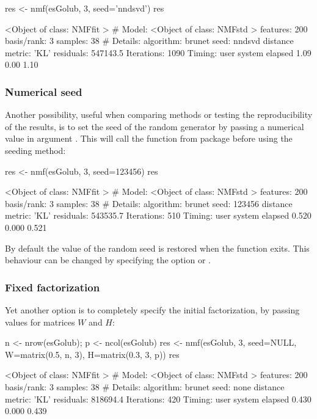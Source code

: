 \documentclass[a4paper]{article}
\begin{document}
\begin{Schunk}
\begin{Sinput}
 res <- nmf(esGolub, 3, seed='nndsvd')
 res
\end{Sinput}
\begin{Soutput}
<Object of class: NMFfit >
 # Model:
  <Object of class: NMFstd >
  features: 200 
  basis/rank: 3 
  samples: 38 
 # Details:
  algorithm:  brunet 
  seed:  nndsvd 
  distance metric:  'KL' 
  residuals:  547143.5 
  Iterations: 1090 
  Timing:
     user  system elapsed 
     1.09    0.00    1.10 
\end{Soutput}
\end{Schunk}

\subsubsection{Numerical seed}
Another possibility, useful when comparing methods or testing the reproducibility of  
the results, is to set the seed of the random generator by passing a numerical value 
in argument . 
This will call the function  from package  before 
using the  seeding method:

\begin{Schunk}
\begin{Sinput}
 res <- nmf(esGolub, 3, seed=123456)
 res
\end{Sinput}
\begin{Soutput}
<Object of class: NMFfit >
 # Model:
  <Object of class: NMFstd >
  features: 200 
  basis/rank: 3 
  samples: 38 
 # Details:
  algorithm:  brunet 
  seed:  123456 
  distance metric:  'KL' 
  residuals:  543535.7 
  Iterations: 510 
  Timing:
     user  system elapsed 
    0.520   0.000   0.521 
\end{Soutput}
\end{Schunk}

By default the value of the random seed is restored when the  function exits.
This behaviour can be changed by specifying the option  or .

\subsubsection{Fixed factorization}
Yet another option is to completely specify the initial factorization, by passing 
values for matrices $W$ and $H$:
\begin{Schunk}
\begin{Sinput}
 n <- nrow(esGolub); p <- ncol(esGolub)
 res <- nmf(esGolub, 3, seed=NULL, W=matrix(0.5, n, 3), H=matrix(0.3, 3, p))
 res
\end{Sinput}
\begin{Soutput}
<Object of class: NMFfit >
 # Model:
  <Object of class: NMFstd >
  features: 200 
  basis/rank: 3 
  samples: 38 
 # Details:
  algorithm:  brunet 
  seed:  none 
  distance metric:  'KL' 
  residuals:  818694.4 
  Iterations: 420 
  Timing:
     user  system elapsed 
    0.430   0.000   0.439 
\end{Soutput}
\end{Schunk}
\end{document}
